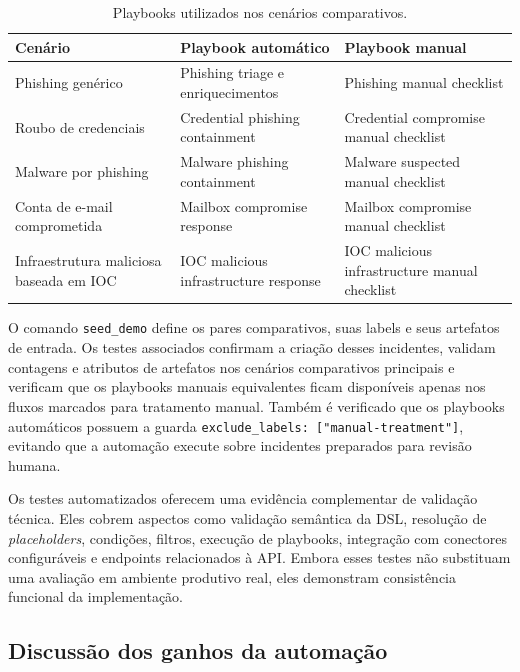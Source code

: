 \documentclass[article,a4paper,12pt,english,brazil,sumario=tradicional]{abntex2}
\begin{document}
\begin{table}[!ht]
\centering
\footnotesize
\renewcommand{\arraystretch}{1.2}
\setlength{\extrarowheight}{1pt}
\setlength{\tabcolsep}{4pt}
\caption{Playbooks utilizados nos cenários comparativos.}
\label{tab:playbooks-cenarios}
\begin{tabularx}{\textwidth}{@{}L{3.7cm} Y Y@{}}
\toprule
\textbf{Cenário} & \textbf{Playbook automático} & \textbf{Playbook manual} \\
\midrule
Phishing genérico & Phishing triage e enriquecimentos & Phishing manual checklist \\
Roubo de credenciais & Credential phishing containment & Credential compromise manual checklist \\
Malware por phishing & Malware phishing containment & Malware suspected manual checklist \\
Conta de e-mail comprometida & Mailbox compromise response & Mailbox compromise manual checklist \\
Infraestrutura maliciosa baseada em IOC & IOC malicious infrastructure response & IOC malicious infrastructure manual checklist \\
\bottomrule
\end{tabularx}
\end{table}

O comando \texttt{seed\_demo} define os pares comparativos, suas labels e seus artefatos de entrada. Os testes associados confirmam a criação desses incidentes, validam contagens e atributos de artefatos nos cenários comparativos principais e verificam que os playbooks manuais equivalentes ficam disponíveis apenas nos fluxos marcados para tratamento manual. Também é verificado que os playbooks automáticos possuem a guarda \texttt{exclude\_labels: ["manual-treatment"]}, evitando que a automação execute sobre incidentes preparados para revisão humana.

Os testes automatizados oferecem uma evidência complementar de validação técnica. Eles cobrem aspectos como validação semântica da DSL, resolução de \textit{placeholders}, condições, filtros, execução de playbooks, integração com conectores configuráveis e endpoints relacionados à API. Embora esses testes não substituam uma avaliação em ambiente produtivo real, eles demonstram consistência funcional da implementação.

\subsection{Discussão dos ganhos da automação}
\end{document}
